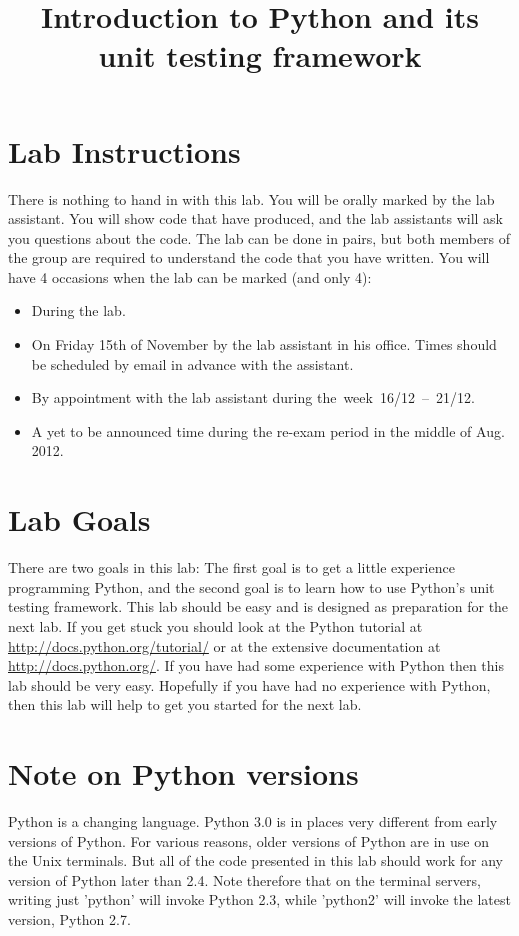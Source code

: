 \documentclass{paper}
\title{Introduction to Python and its unit testing framework}
\begin{document}
\maketitle
\section*{Lab Instructions}
There is nothing to hand in with this lab. You will be orally marked
by the lab assistant. You will show code that have produced,
and the lab assistants will ask you questions about the code. The lab
can be done in pairs, but both members of the group are required to
understand the code that you have written.  You will have 4 occasions
when the lab can be marked (and only 4):
\begin{itemize}
\item During  the lab.
\item On Friday 15th of November  by the lab assistant in his office. Times should be scheduled by email in advance with the assistant.
\item By appointment with the lab assistant during the~week~16/12~--~21/12.
\item A yet to be announced time during the re-exam period in the
  middle of Aug. 2012.
\end{itemize}
\section*{Lab Goals}
There are two goals in this lab: The first goal is to
get a little experience programming Python, and the second goal is to learn how to
use Python's unit testing framework. This lab should be easy and is
designed as preparation for the next lab. If you get stuck you
should look at the Python tutorial at
\url{http://docs.python.org/tutorial/} or at the extensive
documentation at \url{http://docs.python.org/}. If you have had some
experience with Python then this lab should be very easy. Hopefully if
you have had no experience with Python, then this lab will help to get
you started for the next lab.
\section*{Note on Python versions}
Python is a changing language. Python 3.0 is in places very different
from early versions of Python. For various reasons, older versions of
Python are in use on the Unix terminals. But all of the code presented in
this lab should work for any version of Python later than 2.4.
Note therefore that on the terminal servers, writing just 'python' will invoke Python 2.3,
while 'python2' will invoke the latest version, Python 2.7.
\end{document}

